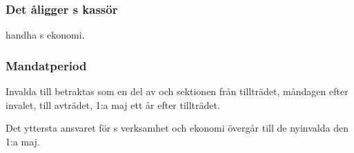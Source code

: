 \subsubsection{Det åligger \DIGIT{}s kassör}
\begin{att}
	\item handha \DIGIT{}s ekonomi.
\end{att}

\subsubsection{Mandatperiod}
Invalda till \DIGIT{} betraktas som en del av \DIGIT{} och sektionen från tillträdet, måndagen efter invalet, till avträdet, 1:a maj ett år efter tillträdet.

Det yttersta ansvaret för \DIGIT{}s verksamhet och ekonomi övergår till de nyinvalda den 1:a maj.



